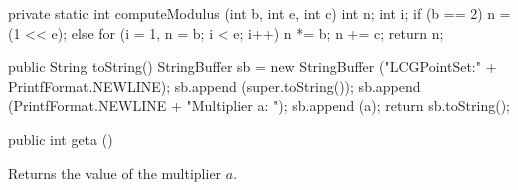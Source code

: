 \begin{code}\begin{hide}
   private static int computeModulus (int b, int e, int c) {
      int n;
      int i;
      if (b == 2) 
         n = (1 << e);
      else {
         for (i = 1, n = b;  i < e;  i++)  n *= b;
         }
      n += c;
      return n;
   }


   public String toString() {
      StringBuffer sb = new StringBuffer ("LCGPointSet:" +
                                           PrintfFormat.NEWLINE);
      sb.append (super.toString());
      sb.append (PrintfFormat.NEWLINE + "Multiplier a: ");
      sb.append (a);
      return sb.toString();
   }
\end{hide}

   public int geta () \begin{hide} {
      return a;
   }
}\end{hide}
\end{code}
 \begin{tabb} Returns the value of the multiplier $a$.
 \end{tabb}
